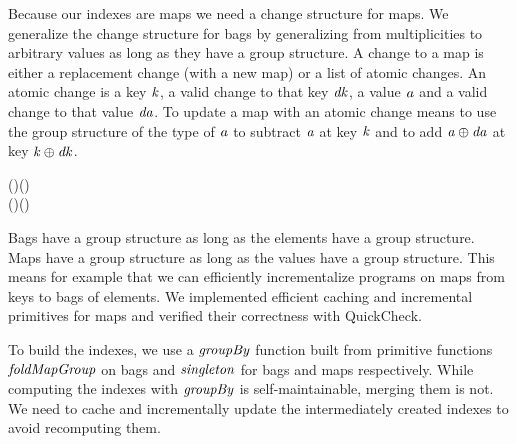Because our indexes are maps we need a change structure for maps. We generalize
the change structure for bags by generalizing from multiplicities to arbitrary
values as long as they have a group structure. A change to a map is either a
replacement change (with a new map) or a list of atomic changes. An atomic
change is a key \ensuremath{\Varid{k}}, a valid change to that key \ensuremath{\Varid{dk}}, a value \ensuremath{\Varid{a}} and a valid
change to that value \ensuremath{\Varid{da}}. To update a map with an atomic change means to use
the group structure of the type of \ensuremath{\Varid{a}} to subtract \ensuremath{\Varid{a}} at key \ensuremath{\Varid{k}} and to add \ensuremath{\Varid{a}\oplus \Varid{da}} at key \ensuremath{\Varid{k}\oplus \Varid{dk}}.

\begin{hscode}\SaveRestoreHook
{}%
%
\>[B]{}\;\Delta (\;\;)\mathrel{=}\;(\;\;)\mid {}\<[E]%
\\
\>[B]{}\;\;\;\mathrel{=}\;\;(\Delta {})\;\;(\Delta {}){}\<[E]%
\ColumnHook
\end{hscode}\resethooks

Bags have a group structure as long as the elements have a group structure. Maps
have a group structure as long as the values have a group structure. This means
for example that we can efficiently incrementalize programs on maps from keys
to bags of elements. We implemented efficient caching and incremental primitives
for maps and verified their correctness with QuickCheck.

To build the indexes, we use a \ensuremath{\Varid{groupBy}} function built from primitive
functions \ensuremath{\Varid{foldMapGroup}} on bags and \ensuremath{\Varid{singleton}} for bags
and maps respectively. While computing the indexes with \ensuremath{\Varid{groupBy}} is
self-maintainable, merging them is not. We need to cache and incrementally
update the intermediately created indexes to avoid recomputing them.

